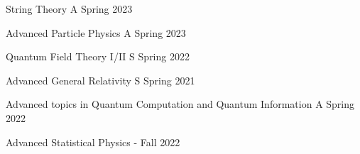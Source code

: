 
\begin{multicols}{2}

\setlength{\parskip}{0\baselineskip}%


\begin{cvcourseworks}

\cvcoursework
    {String Theory} %
    {} %
    {A} %
    {Spring 2023} %

\cvcoursework
    {Advanced Particle Physics} %
    {} %
    {A} %
    {Spring 2023} %

  \cvcoursework
    {Quantum Field Theory I/II} %
    {} %
    {S} %
    {Spring 2022} %

  \cvcoursework
    {Advanced General Relativity} %
    {} %
    {S} %
    {Spring 2021} %

  \cvcoursework
    {Advanced topics in Quantum Computation and Quantum Information} %
    {} %
    {A} %
    {Spring 2022} %

  \cvcoursework
    {Advanced Statistical Physics} %
    {} %
    {-} %
    {Fall 2022} %


\end{cvcourseworks}

\columnbreak



\end{multicols}
